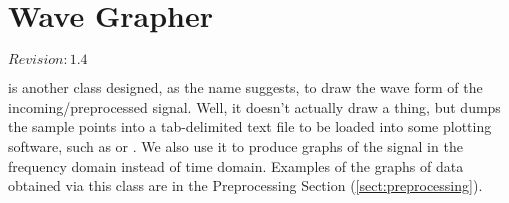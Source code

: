 \section{Wave Grapher}

$Revision: 1.4 $

 is another class designed, as the name
suggests, to draw the wave form of the incoming/preprocessed
signal. Well, it doesn't actually draw a thing, but dumps
the sample points into a tab-delimited text file to be loaded
into some plotting software, such as  or . We also
use it to produce graphs of the signal in the frequency domain
instead of time domain. Examples of the graphs of data obtained
via this class are in the Preprocessing Section (\ref{sect:preprocessing}).

